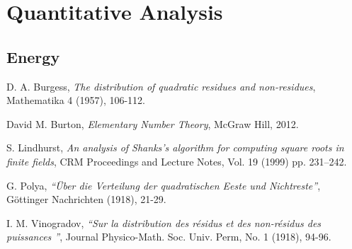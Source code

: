 \documentclass{report}
\begin{document}
\chapter{Quantitative Analysis}
\section{Energy}
%
%
\begin{thebibliography}{9}

 D. A. Burgess,
\textit{The distribution of quadratic residues and non-residues},
Mathematika 4 (1957), 106-112.

David M. Burton, \textit{Elementary Number Theory},
McGraw Hill, 2012.

S. Lindhurst, \textit{An analysis of Shanks's algorithm for computing square roots in finite fields},
CRM Proceedings and Lecture Notes, Vol. 19 (1999) pp. 231–242.

G. Polya,
\textit{``{\"U}ber die Verteilung der quadratischen Eeste und Nichtreste''},
G{\"o}ttinger Nachrichten (1918), 21-29.

I. M. Vinogradov,
\textit{``Sur la distribution des r{\'e}sidus et des non-r{\'e}sidus des puissances ''},
Journal Physico-Math. Soc. Univ. Perm, No. 1 (1918), 94-96.

\end{thebibliography}
%
\end{document}
